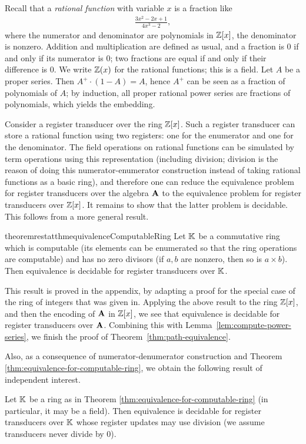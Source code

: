 Recall that a \emph{rational function} with variable $x$ is a fraction like 
\begin{align*}
\frac{3x^2 -2x +1}{4x^3 -2},
\end{align*}
where  the numerator and denominator are polynomials in $\mathbb Z[x]$, the denominator is nonzero. Addition and multiplication are defined as usual, and a fraction is 0 if and only if its numerator is 0; two fractions are equal if and only if their difference is 0. We write $\mathbb Z(x)$ for the rational functions; this is a field. Let $A$ be a proper series. Then $A^+ \cdot (1-A) = A$, hence $A^+$ can be seen as a fraction of polynomials of $A$; by induction, all proper rational power series  are fractions of polynomials, which yields the embedding. 

Consider a register transducer over the ring $\mathbb Z[x]$. Such a register transducer can store a rational function using two registers: one for the enumerator and one for the denominator. The field operations on rational functions can be simulated by term operations using this representation (including division; division is the reason of doing this numerator-enumerator construction instead of taking rational functions as a basic ring), and therefore one can reduce the equivalence problem for register transducers over the algebra $\mathbf{A}$ to the equivalence problem for register transducers over $\mathbb Z[x]$. It remains to show that the latter problem is decidable. This follows from a more general result.

\begin{restatable}{theoremrestat}{thmequivalenceComputableRing}\label{thm:equivalence-for-computable-ring}
    Let ${\mathbb K}$ be a commutative ring which is computable (its elements can be enumerated so that the ring operations are computable) and has no zero divisors (if $a,b$ are nonzero, then so is $a \times b$). Then equivalence is decidable for register transducers over ${\mathbb K}$.
\end{restatable}
This result is proved in the appendix, by adapting a proof for the special case of the ring of integers that was given in\cite[Theorem 6.6]{seidlManethKemper2018}. 
Applying the above result to the ring $\mathbb Z[x]$, and then the encoding of $\mathbf{A}$ in $\mathbb Z[x]$, we see that equivalence is decidable for register transducers over $\mathbf{A}$. Combining this with Lemma~\ref{lem:compute-power-series}, we finish the proof of Theorem~\ref{thm:path-equivalence}.

Also, as a consequence of numerator-denumerator construction and Theorem \ref{thm:equivalence-for-computable-ring}, we obtain the following result of independent interest.
\begin{theorem}\label{thm:equivalence-with-division}
    Let ${\mathbb K}$ be a ring as in Theorem \ref{thm:equivalence-for-computable-ring} (in particular, it may be a field). Then equivalence is decidable for register transducers over ${\mathbb K}$ whose register updates may use division (we assume transducers never divide by 0).
\end{theorem}



